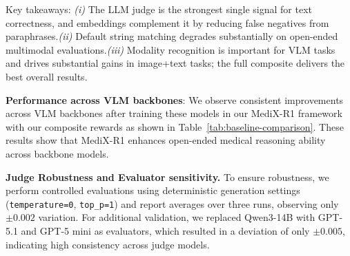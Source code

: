 \documentclass{article}
\theoremstyle{plain}
\theoremstyle{definition}
\theoremstyle{remark}
\begin{document}
Key takeaways: \textit{(i)} The LLM judge is the strongest single signal for text correctness, and embeddings complement it by reducing false negatives from paraphrases.\textit{(ii)} Default string matching degrades substantially on open-ended multimodal evaluations.\textit{(iii)} Modality recognition is important for VLM tasks and drives substantial gains in image+text tasks; the full composite delivers the best overall results.

\noindent\textbf{Performance across VLM backbones}: We observe consistent improvements across VLM backbones after training these models in our MediX-R1 framework with our composite rewards as shown in Table~\ref{tab:baseline-comparison}. These results show that MediX-R1 enhances open-ended medical reasoning ability across backbone models.

\noindent\textbf{Judge Robustness and Evaluator sensitivity.}
To ensure robustness, we perform controlled evaluations using deterministic generation settings {\footnotesize(\texttt{temperature=0}, \texttt{top\_p=1})} and report averages over three runs, observing only $\pm 0.002$ variation. For additional validation, we replaced Qwen3-14B with GPT-5.1 and GPT-5 mini as evaluators, which resulted in a deviation of only $\pm 0.005$, indicating high consistency across judge models.

\begin{table}[t!]
\caption{\textbf{Reward ablation across validation benchmarks.} Single signals like default string matching, embedding-only or LLM-only are weaker. Combining LLM + embedding improves robustness, and the MediX-R1 composite (LLM accuracy + embedding-based semantics + modality recognition) yields the best overall average.}
\label{tab:reward-ablation}
\end{table}
\end{document}
